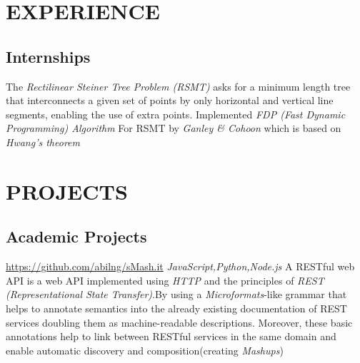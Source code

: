 \documentclass[11pt,a4paper,sans]{moderncv}
\begin{document}


\section{EXPERIENCE}
\subsection{Internships}

{The \textit{Rectilinear Steiner Tree Problem (RSMT)} asks for a minimum length tree that interconnects a given set of points by only horizontal and vertical line segments, enabling the use of extra points. Implemented \textit{ FDP (Fast Dynamic Programming) Algorithm } For RSMT by \textit{ Ganley \& Cohoon } which is based on \textit{ Hwang’s theorem}}

\section{PROJECTS}
\subsection{Academic Projects}
{\newline \url{https://github.com/abilng/sMash.it}}{}
{\hfill \textit{JavaScript,Python,Node.js}}
{A RESTful web API is a web API implemented using \textit{HTTP }and the principles of \textit{REST (Representational State Transfer)}.By using  a \textit{Microformats}-like grammar that helps to annotate semantics into the already existing documentation of REST services doubling them as machine-readable descriptions. Moreover, these basic annotations help to link between RESTful services in the same domain and enable automatic discovery and composition(creating \textit{Mashups})\newline}

\end{document}
